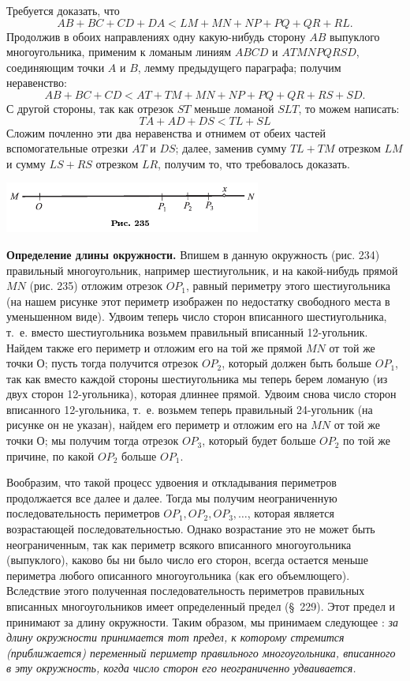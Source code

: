 \documentclass[oneside]{book}
\begin{document}
Требуется доказать, что
\[AB+BC+CD+DA < LM+MN+NP+PQ+QR+RL.\]
Продолжив в обоих направлениях одну какую-нибудь сторону $AB$ выпуклого многоугольника, применим к ломаным линиям $ABCD$ и $ATMNPQRSD$, соединяющим точки $A$ и $B$, лемму предыдущего параграфа;
получим неравенство:
\[AB+BC+CD<AT+TM+MN+NP+PQ+QR+RS+SD.\]
С другой стороны, так как отрезок $ST$ меньше ломаной $SLT$, то можем написать:
\[TA+AD+DS<TL+SL\]
Сложим почленно эти два неравенства и отнимем от обеих частей вспомогательные отрезки $AT$ и $DS$;
далее, заменив сумму $TL+TM$ отрезком $LM$ и сумму $LS+RS$ отрезком $LR$, получим то, что требовалось доказать.

\includegraphics{pics/ris-235}

\textbf{Определение длины окружности.}
Впишем в данную окружность (рис. 234) правильный многоугольник, например шестиугольник, и на какой-нибудь прямой $MN$ (рис. 235) отложим отрезок $OP_1$, равный периметру этого шестиугольника (на нашем рисунке этот периметр изображен по недостатку свободного места в уменьшенном виде).
Удвоим теперь число сторон вписанного шестиугольника, т.~е.
вместо шестиугольника возьмем правильный вписанный 12-угольник.
Найдем также его периметр и отложим его на той же прямой $MN$ от той же точки О;
пусть тогда получится отрезок $OP_2$, который должен быть больше $OP_1$, так как вместо каждой стороны шестиугольника мы теперь берем ломаную (из двух сторон 12-угольника), которая длиннее прямой.
Удвоим снова число сторон вписанного 12-угольника, т.~е. возьмем теперь правильный 24-угольник (на рисунке он не указан), найдем его периметр и отложим его на $MN$ от той же точки О; мы получим тогда отрезок $OP_3$, который будет больше $OP_2$ по той же причине, по какой $OP_2$ больше $OP_1$.

Вообразим, что такой процесс удвоения и откладывания периметров продолжается все далее и далее.
Тогда мы получим неограниченную последовательность периметров $OP_1, OP_2, OP_3,\dots$, которая является возрастающей последовательностью.
Однако возрастание это не может быть неограниченным, так как периметр всякого вписанного многоугольника (выпуклого), каково бы ни было число его сторон, всегда остается меньше периметра любого описанного многоугольника (как его объемлющего).
Вследствие этого полученная последовательность периметров правильных вписанных многоугольников имеет определенный предел (§~229).
Этот предел и принимают за длину окружности.
Таким образом, мы принимаем следующее :
\emph{за длину окружности принимается тот предел, к которому стремится (приближается) переменный периметр правильного многоугольника, вписанного в эту окружность, когда число сторон его неограниченно удваивается.}
\end{document}
